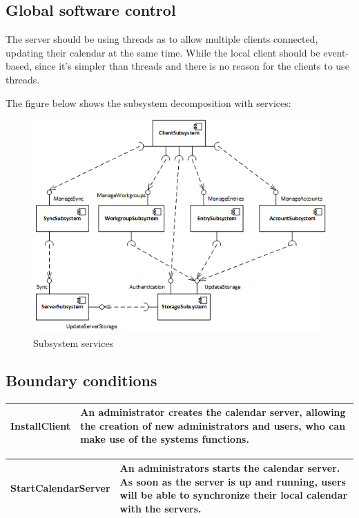 \subsection{Global software control}
The server should be using threads as to allow multiple clients connected, updating their calendar at the same time. While the local client should be event-based, since it’s simpler than threads and there is no reason for the clients to use threads.

The figure below shows the subsystem decomposition with services:

\begin{figure}[h]
\centering
\includegraphics[scale = 0.7]{services}
\caption{Subsystem services}
\end{figure}

\subsection{Boundary conditions}

\begin{center}
    \begin{tabular}{ | l | p{10cm} |}
    \hline
    InstallClient & An administrator creates the calendar server, allowing the creation of new administrators and users, who can make use of the systems functions. \\ \hline
    \end{tabular}
\end{center}

\begin{center}
    \begin{tabular}{ | l | p{10cm} |}
    \hline
    StartCalendarServer & An administrators starts the calendar server. As soon as the server is up and running, users will be able to synchronize their local calendar with the servers. \\ \hline
    \end{tabular}
\end{center}

